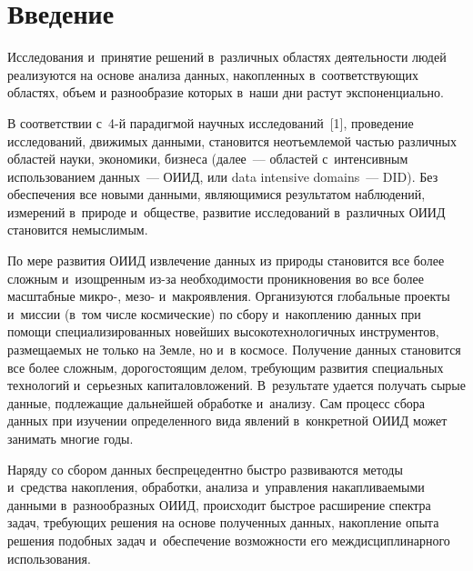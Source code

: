 \begin{multicols}{2}

\label{st\stat}

\section{Введение}

\vspace*{-2pt}

  Исследования и~принятие решений в~различных областях деятельности людей 
реализуются на основе анализа данных, накопленных в~соответствующих областях, объем 
и разнообразие которых в~наши дни растут экспоненциально.
  
  В соответствии с~4-й парадигмой научных исследований~[1], проведение исследований, 
движимых данными, становится неотъемлемой частью различных областей науки, 
экономики, бизнеса (далее~--- областей с~интенсивным использованием данных~--- ОИИД, 
или data intensive domains~--- DID). Без обеспечения все новыми данными, являющимися 
результатом наблюдений, измерений в~природе и~обществе, развитие исследований 
в~различных ОИИД становится немыслимым. 

По мере развития ОИИД извлечение данных 
из природы становится все более сложным и~изощренным из-за необходимости 
проникновения во все более масштабные микро-, мезо- и~макроявления. Организуются 
глобальные проекты и~миссии (в~том чис\-ле космические) по сбору и~накоплению данных 
при помощи специализированных новейших высокотехнологичных инструментов, 
размещаемых не только на Земле, но и~в космосе. Получение данных становится все более 
сложным, дорогостоящим делом, требующим развития специальных технологий 
и~серьезных капиталовложений. В~результате удается получать сырые данные, 
подлежащие дальнейшей обработке и~анализу. Сам процесс сбора данных при изучении 
определенного вида явлений в~конкретной ОИИД может занимать многие годы. 

Наряду со 
сбором данных беспрецедентно быстро развиваются методы и~средства накопления, 
обработки, анализа и~управ\-ле\-ния накапливаемыми данными в~разнообразных ОИИД, 
происходит быстрое расширение спектра задач, требующих решения на основе 
полученных данных, накопление опыта решения подобных задач и~обеспечение 
возможности его междисциплинарного использования. 
  

\end{multicols}

